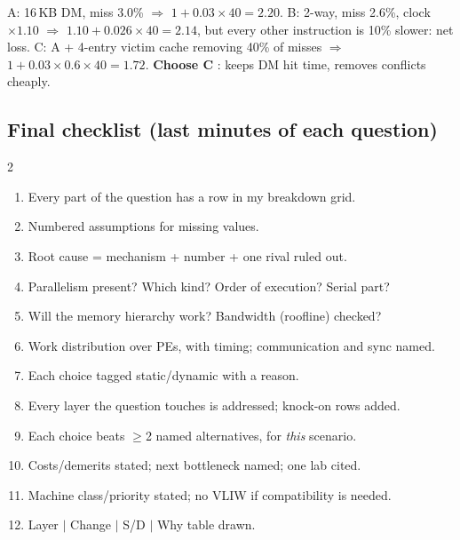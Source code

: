 \begin{ex}
A: 16\,KB DM, miss 3.0\% $\Rightarrow$ $1+0.03\times40=2.20$. B: 2-way, miss 2.6\%, clock $\times1.10$ $\Rightarrow$ $1.10+0.026\times40=2.14$, but every other instruction is 10\% slower: net loss. C: A + 4-entry victim cache removing 40\% of misses $\Rightarrow$ $1+0.03\times0.6\times40=1.72$. \textbf{Choose C} : keeps DM hit time, removes conflicts cheaply.
\end{ex}

\subsection{Final checklist (last minutes of each question)}\label{sec:checklist}
\begin{multicols}{2}
\begin{enumerate}[label=$\square$]
\item Every part of the question has a row in my breakdown grid.
\item Numbered assumptions for missing values.
\item Root cause = mechanism + number + one rival ruled out.
\item Parallelism present? Which kind? Order of execution? Serial part?
\item Will the memory hierarchy work? Bandwidth (roofline) checked?
\item Work distribution over PEs, with timing; communication and sync named.
\item Each choice tagged static/dynamic with a reason.
\item Every layer the question touches is addressed; knock-on rows added.
\item Each choice beats $\ge$2 named alternatives, for \emph{this} scenario.
\item Costs/demerits stated; next bottleneck named; one lab cited.
\item Machine class/priority stated; no VLIW if compatibility is needed.
\item Layer $|$ Change $|$ S/D $|$ Why table drawn.
\end{enumerate}
\end{multicols}
